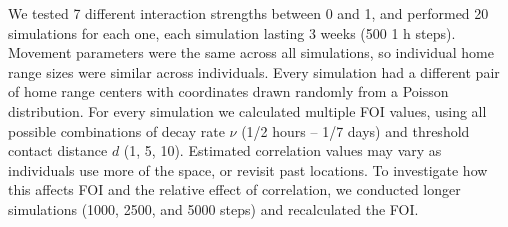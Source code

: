 \documentclass[letterpaper]{article}
\begin{document}
We tested 7 different interaction strengths between 0 and 1, and performed 20 simulations for each one, each simulation lasting 3 weeks (500 1 h steps). Movement parameters were the same across all simulations, so individual home range sizes were similar across individuals. Every simulation had a different pair of home range centers with coordinates drawn randomly from a Poisson distribution. For every simulation we calculated multiple FOI values, using all possible combinations of decay rate $\nu$ (1/2 hours -- 1/7 days) and threshold contact distance $d$ (1, 5, 10). Estimated correlation values may vary as individuals use more of the space, or revisit past locations. To investigate how this affects FOI and the relative effect of correlation, we conducted longer simulations (1000, 2500, and 5000 steps) and recalculated the FOI. 




\end{document}
